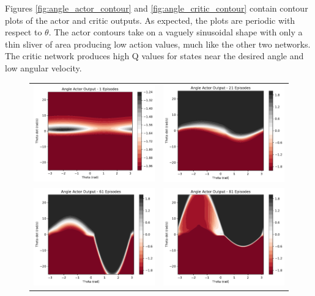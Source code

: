 Figures \ref{fig:angle_actor_contour} and \ref{fig:angle_critic_contour} contain contour plots of the actor and critic outputs. As expected, the plots are periodic with respect to $\theta$. The actor contours take on a vaguely sinusoidal shape with only a thin sliver of area producing low action values, much like the other two networks. The critic network produces high Q values for states near the desired angle and low angular velocity.
\begin{figure}[H]
	\begin{tabular}{cc}
		\includegraphics[width=65mm]{figures/train_figs/angle_actor/Actor0_1.pdf} &  
		\includegraphics[width=65mm]{figures/train_figs/angle_actor/Actor0_21.pdf} \\
		\includegraphics[width=65mm]{figures/train_figs/angle_actor/Actor0_61.pdf} &   \includegraphics[width=65mm]{figures/train_figs/angle_actor/Actor0_81.pdf} \\

\end{tabular}
\end{figure}
